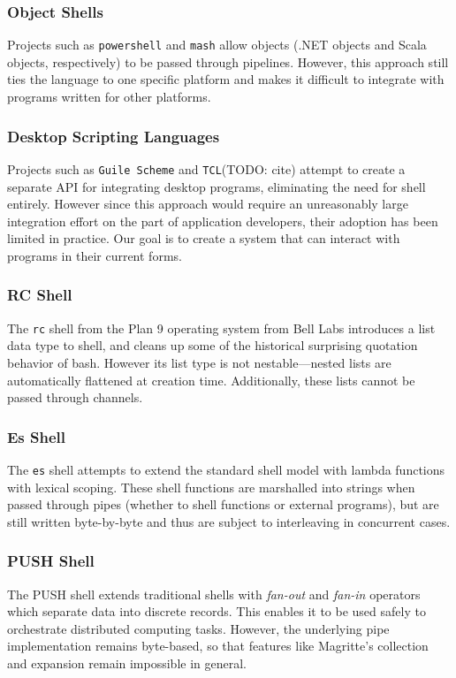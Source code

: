 \documentclass[english,preprint,JIP,uplatex]{ipsj}
\begin{document}
\subsubsection{Object Shells}
\noindent
Projects such as \verb/powershell/ and \verb/mash/ allow objects (.NET objects and Scala objects, respectively) to be passed through pipelines. However, this approach still ties the language to one specific platform and makes it difficult to integrate with programs written for other platforms.

\subsubsection{Desktop Scripting Languages}
Projects such as \verb/Guile Scheme/\cite{guile} and \verb/TCL/(TODO: cite) attempt to create a separate API for integrating desktop programs, eliminating the need for shell entirely. However since this approach would require an unreasonably large integration effort on the part of application developers, their adoption has been limited in practice. Our goal is to create a system that can interact with programs in their current forms.

\subsubsection{RC Shell}
\noindent
The \verb/rc/ shell \cite{duff} from the Plan 9 operating system from Bell Labs introduces a list data type to shell, and cleans up some of the historical surprising quotation behavior of bash. However its list type is not nestable---nested lists are automatically flattened at creation time. Additionally, these lists cannot be passed through channels.

\subsubsection{Es Shell}
\noindent
The \verb/es/ shell \cite{haahr} attempts to extend the standard shell model with lambda functions with lexical scoping. These shell functions are marshalled into strings when passed through pipes (whether to shell functions or external programs), but are still written byte-by-byte and thus are subject to interleaving in concurrent cases.

\subsubsection{PUSH Shell}
\noindent
The PUSH shell\cite{push} extends traditional shells with \emph{fan-out} and \emph{fan-in} operators which separate data into discrete records. This enables it to be used safely to orchestrate distributed computing tasks. However, the underlying pipe implementation remains byte-based, so that features like Magritte's collection and expansion remain impossible in general.
\end{document}
